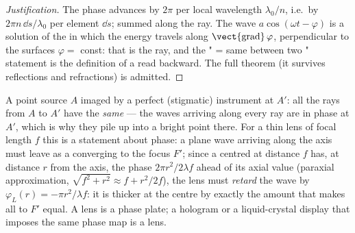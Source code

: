 \begin{proof}[Justification]
The phase advances by $2\pi$ per local wavelength $\lambda_0/n$, i.e.\ by
$2\pi n\,\dd s/\lambda_0$ per element $\dd s$; summed along the ray. The wave
$a\cos(\omega t - \varphi)$ is a solution of the  in which the
energy travels along $\operatorname{\vect{grad}}\varphi$, perpendicular to the
surfaces $\varphi = $ const: that is the ray, and the " = same
between two " statement is the definition of a 
read backward. The full theorem (it survives reflections and
refractions) is admitted.
\end{proof}

\begin{example}\label{ex:b2:scalar-light-model:lens}
A point source $A$ imaged by a perfect (stigmatic) instrument at $A'$:
all the rays from $A$ to $A'$ have the \emph{same } --- the
waves arriving along every ray are in phase at $A'$, which is why they
pile up into a bright point there. For a thin lens of focal length $f$
this is a statement about phase: a plane wave arriving along the axis
must leave as a  converging to the focus $F'$; since a
 centred at distance $f$ has, at distance $r$ from the axis,
the phase $2\pi r^2/2\lambda f$ ahead of its axial value (paraxial
approximation, $\sqrt{f^2 + r^2} \approx f + r^2/2f$), the lens must
\emph{retard} the wave by $\varphi_L(r) = -\pi r^2/\lambda f$: it is thicker at
the centre by exactly the amount that makes all  to $F'$
equal. A lens is a phase plate; a hologram or a liquid-crystal display
that imposes the same phase map is a lens.
\end{example}


